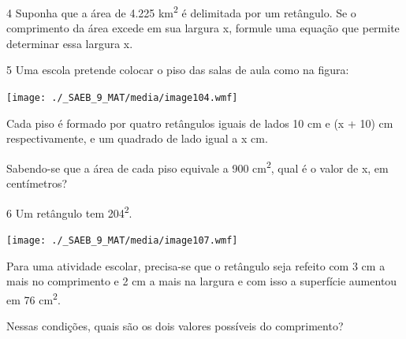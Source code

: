 {{{\begin{escolha}
{

\num{4} Suponha que a área de 4.225 km\textsuperscript{2} é delimitada por um
retângulo. Se o comprimento da área excede em sua largura x, formule uma 
equação que permite determinar essa largura x.


\num{5} Uma escola pretende colocar o piso das salas de aula como na
figura:

\texttt{[image: ./\_SAEB\_9\_MAT/media/image104.wmf]}

Cada piso é formado por quatro retângulos iguais de lados 10 cm e (x +
10) cm respectivamente, e um quadrado de lado igual a x cm.

Sabendo-se que a área de cada piso equivale a 900 cm\textsuperscript{2},
qual é o valor de x, em centímetros?


\num{6} Um retângulo tem 204\textsuperscript{2}.

\texttt{[image: ./\_SAEB\_9\_MAT/media/image107.wmf]}

Para uma atividade escolar, precisa-se que o retângulo seja refeito com 3
cm a mais no comprimento e 2 cm a mais na largura e com isso a
superfície aumentou em 76 cm\textsuperscript{2}.

Nessas condições, quais são os dois valores possíveis do comprimento?


}
\end{escolha}}}}
